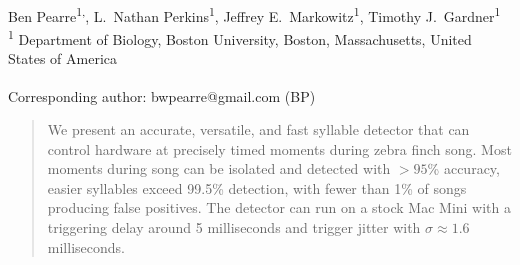\documentclass[10pt,letterpaper]{article}
\date{}
\begin{document}
\vspace*{0.35in}

\begin{flushleft}
{\Large
\textbf{}
}
\newline
\\
Ben Pearre\textsuperscript{1,\textcurrency},
L.~Nathan Perkins\textsuperscript{1},
Jeffrey E.~Markowitz\textsuperscript{1},
Timothy J.~Gardner\textsuperscript{1}
\\
\bigskip
\textsuperscript{1} Department of Biology, Boston University, Boston, Massachusetts, United States of America
\\
\bigskip

% 
%





\textsuperscript{\textcurrency} Corresponding author: bwpearre@gmail.com (BP)

\end{flushleft}

\reversemarginpar



\begin{abstract}
  We present an accurate, versatile, and fast syllable detector that
  can control hardware at precisely timed moments during zebra finch
  song. Most moments during song can be isolated and detected with
  $>95$\% accuracy, easier syllables exceed 99.5\% detection, with
  fewer than 1\% of songs producing false positives. The detector can run on a stock
  Mac Mini with a triggering delay around 5 milliseconds and trigger
  jitter with $\sigma\approx 1.6$ milliseconds.
\end{abstract}
\end{document}
